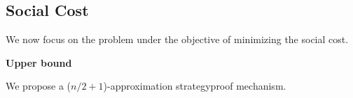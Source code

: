 \documentclass[twoside,11pt]{article}
\begin{document}
%
%

\subsection{Social Cost}
\label{sec-min-social}
\noindent We now focus on the problem under the objective of minimizing the social cost.

\noindent\textbf{Upper bound}

\noindent
We propose a ($n/2+1$)-approximation strategyproof mechanism.
\end{document}
